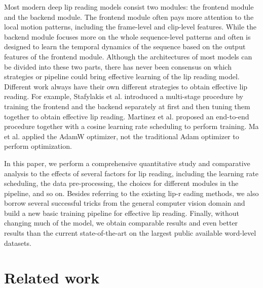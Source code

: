 \documentclass{article}
\begin{document}
Most modern deep lip reading models consist two modules: the frontend module and the backend module. 
The frontend module often pays more attention to the local motion patterns, including the frame-level and clip-level features. While the backend module focuses more on the whole sequence-level patterns and often is designed to learn the temporal dynamics of the sequence based on the output features of the frontend module. 
Although the architectures of most models can be divided into these two parts, there has never been consensus on which strategies or pipeline could bring effective learning of the lip reading model. Different work always have their own different strategies to obtain effective lip reading. 
For example, Stafylakis et al. \cite{stafylakiscombining} introduced a multi-stage procedure by training the frontend and the backend separately at first and then tuning them together to obtain effective lip reading. Martinez et al. \cite{martinez2020lipreading} proposed an end-to-end procedure together with a cosine learning rate scheduling to perform training. Ma et al.\cite{ma2020towards} applied the AdamW optimizer, not the traditional Adam optimizer to perform optimization. 

In this paper, we perform a comprehensive quantitative study and comparative analysis to the effects of several factors for lip reading, including the learning rate scheduling, the data pre-processing, the choices for different modules in the pipeline, and so on. 
Besides referring to the existing lip-r
eading methods, we also borrow several successful tricks from the general computer vision domain and build a new basic training pipeline for effective lip reading. 
Finally, without changing much of the model, we obtain comparable results and even better results than the current state-of-the-art on the largest public available word-level datasets.
\vspace{-1em}
\section{Related work}
\label{sec:related}
\vspace{-0.5em}
\end{document}
